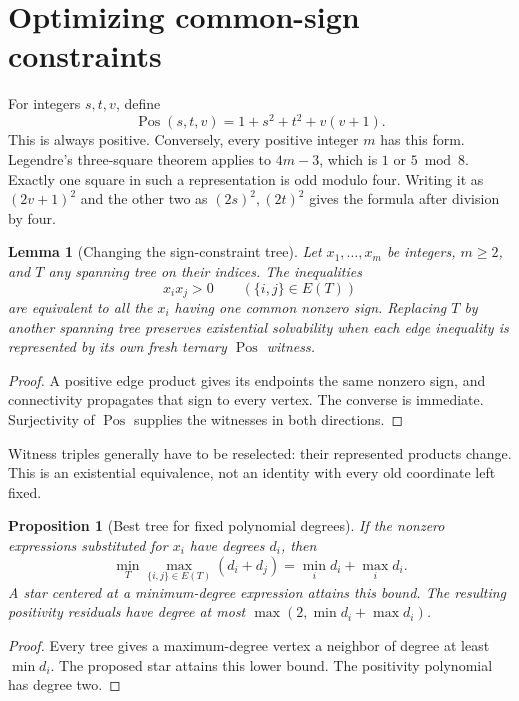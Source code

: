 \documentclass[11pt,a4paper]{article}
\newtheorem{lemma}[theorem]{Lemma}
\newtheorem{proposition}[theorem]{Proposition}
\theoremstyle{definition}
\newcommand{\Pos}{\operatorname{Pos}}
\begin{document}
\section{Optimizing common-sign constraints}
\label{sec:sign}

For integers \(s,t,v\), define
\[
 \Pos(s,t,v)=1+s^2+t^2+v(v+1).                  \label{eq:pos}
\]
This is always positive. Conversely, every positive integer \(m\)
has this form. Legendre's three-square theorem applies to
\(4m-3\), which is \(1\) or \(5\bmod8\). Exactly one square in
such a representation is odd modulo four. Writing it as
\((2v+1)^2\) and the other two as \((2s)^2,(2t)^2\) gives the
formula after division by four.

\begin{lemma}[Changing the sign-constraint tree]
\label{lem:tree}
Let \(x_1,\ldots,x_m\) be integers, \(m\ge2\), and \(T\) any
spanning tree on their indices. The inequalities
\[
 x_ix_j>0\qquad(\{i,j\}\in E(T))
\]
are equivalent to all the \(x_i\) having one common nonzero sign.
Replacing \(T\) by another spanning tree preserves existential
solvability when each edge inequality is represented by its own
fresh ternary \(\Pos\) witness.
\end{lemma}
\begin{proof}
A positive edge product gives its endpoints the same nonzero
sign, and connectivity propagates that sign to every vertex.
The converse is immediate. Surjectivity of \(\Pos\) supplies
the witnesses in both directions.
\end{proof}

Witness triples generally have to be reselected: their represented
products change. This is an existential equivalence, not an
identity with every old coordinate left fixed.

\begin{proposition}[Best tree for fixed polynomial degrees]
\label{prop:tree-degree}
If the nonzero expressions substituted for \(x_i\) have degrees
\(d_i\), then
\[
 \min_T\max_{\{i,j\}\in E(T)}(d_i+d_j)
       =\min_i d_i+\max_i d_i.
\]
A star centered at a minimum-degree expression attains this
bound. The resulting positivity residuals have degree at most
\(\max(2,\min d_i+\max d_i)\).
\end{proposition}
\begin{proof}
Every tree gives a maximum-degree vertex a neighbor of degree
at least \(\min d_i\). The proposed star attains this lower
bound. The positivity polynomial has degree two.
\end{proof}
\end{document}
